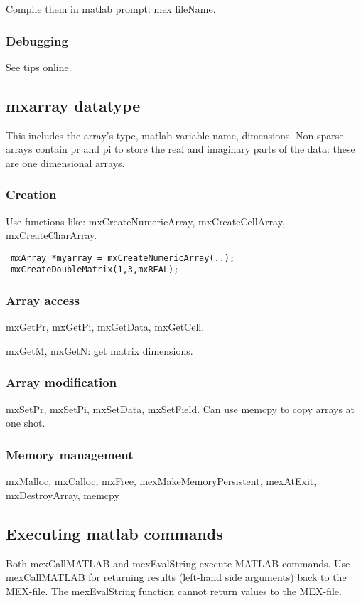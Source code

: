 Compile them in matlab prompt: mex fileName.

\subsubsection{Debugging}
See tips online.

\subsection{mxarray datatype}
This includes the array's type, matlab variable name, dimensions. Non-sparse arrays contain pr and pi to store the real and imaginary parts of the data: these are one dimensional arrays.

\subsubsection{Creation}
Use functions like: mxCreateNumericArray, mxCreateCellArray, mxCreateCharArray.

\begin{verbatim}
 mxArray *myarray = mxCreateNumericArray(..);
 mxCreateDoubleMatrix(1,3,mxREAL);
\end{verbatim}

\subsubsection{Array access}
mxGetPr, mxGetPi, mxGetData, mxGetCell.

mxGetM, mxGetN: get matrix dimensions.

\subsubsection{Array modification}
mxSetPr, mxSetPi, mxSetData, mxSetField. Can use memcpy to copy arrays at one shot.

\subsubsection{Memory management}
mxMalloc, mxCalloc, mxFree, mexMakeMemoryPersistent, mexAtExit, mxDestroyArray, memcpy

\subsection{Executing matlab commands}
Both mexCallMATLAB and mexEvalString execute MATLAB commands. Use mexCallMATLAB for returning results (left-hand side arguments) back to the MEX-file. The mexEvalString function cannot return values to the MEX-file.

